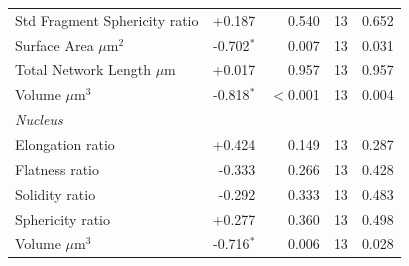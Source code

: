 \documentclass[11pt,a4paper]{article}
\begin{document}
\begin{longtable}{lrrrr}
  Std Fragment Sphericity ratio & +0.187 & 0.540 & 13 & 0.652 \\
  Surface Area $\mu$m$^{2}$ & -0.702$^{*}$ & 0.007 & 13 & 0.031 \\
  Total Network Length $\mu$m & +0.017 & 0.957 & 13 & 0.957 \\
  Volume $\mu$m$^{3}$ & -0.818$^{*}$ & $<$0.001 & 13 & 0.004 \\
\midrule
\multicolumn{5}{l}{\textit{Nucleus}} \\
  Elongation ratio & +0.424 & 0.149 & 13 & 0.287 \\
  Flatness ratio & -0.333 & 0.266 & 13 & 0.428 \\
  Solidity ratio & -0.292 & 0.333 & 13 & 0.483 \\
  Sphericity ratio & +0.277 & 0.360 & 13 & 0.498 \\
  Volume $\mu$m$^{3}$ & -0.716$^{*}$ & 0.006 & 13 & 0.028 \\
\bottomrule
\end{longtable}
\end{document}

